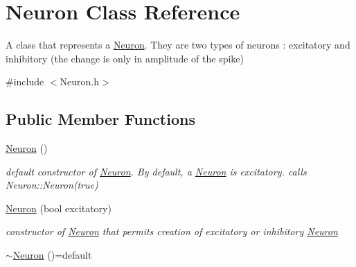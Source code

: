 \hypertarget{classNeuron}{}\section{Neuron Class Reference}
\label{classNeuron}


A class that represents a \hyperlink{classNeuron}{Neuron}. They are two types of neurons \+: excitatory and inhibitory (the change is only in amplitude of the spike)  




{\ttfamily \#include $<$Neuron.\+h$>$}

\subsection*{Public Member Functions}
\begin{DoxyCompactItemize}
\item 
\hyperlink{classNeuron_a823487d01615fadb8ac19a2768dd9d96}{Neuron} ()
\begin{DoxyCompactList}\small\item\em default constructor of \hyperlink{classNeuron}{Neuron}. By default, a \hyperlink{classNeuron}{Neuron} is excitatory. calls Neuron\+::\+Neuron(true) \end{DoxyCompactList}\item 
\hyperlink{classNeuron_af1ec9cf091aa834daf3078d02e2ad75a}{Neuron} (bool excitatory)
\begin{DoxyCompactList}\small\item\em constructor of \hyperlink{classNeuron}{Neuron} that permits creation of excitatory or inhibitory \hyperlink{classNeuron}{Neuron} \end{DoxyCompactList}\item 
\hyperlink{classNeuron_a7350045966914cd4bcddac6706e7d864}{$\sim$\+Neuron} ()=default\hypertarget{classNeuron_a7350045966914cd4bcddac6706e7d864}{}\label{classNeuron_a7350045966914cd4bcddac6706e7d864}


\end{DoxyCompactItemize}
